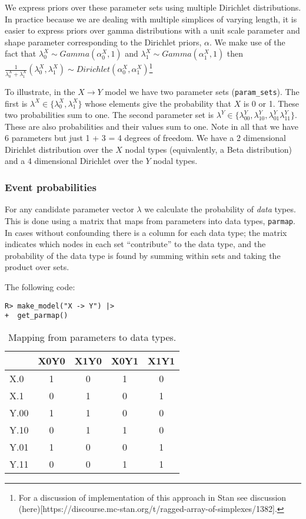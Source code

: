 \documentclass[
  11pt,
  article]{jss}
\begin{document}
We express priors over these parameter sets using multiple Dirichlet
distributions. In practice because we are dealing with multiple
simplices of varying length, it is easier to express priors over gamma
distributions with a unit scale parameter and shape parameter
corresponding to the Dirichlet priors, \(\alpha\). We make use of the
fact that \(\lambda^X_0 \sim Gamma(\alpha^X_0,1)\) and
\(\lambda^X_1 \sim Gamma(\alpha^X_1,1)\) then
\(\frac{1}{\lambda^X_0 +\lambda^X_1}(\lambda^X_0, \lambda^X_1) \sim Dirichlet(\alpha^X_0, \alpha^X_1)\)\footnote{For
  a discussion of implementation of this approach in Stan see discussion
  (here){[}https://discourse.mc-stan.org/t/ragged-array-of-simplexes/1382{]}.}

To illustrate, in the \(X \rightarrow Y\) model we have two parameter
sets (\texttt{param\_sets}). The first is
\(\lambda^X \in \{\lambda^X_0, \lambda^X_1\}\) whose elements give the
probability that \(X\) is 0 or 1. These two probabilities sum to one.
The second parameter set is
\(\lambda^Y \in \{\lambda^Y_{00}, \lambda^Y_{10}, \lambda^Y_{01} \lambda^Y_{11}\}\).
These are also probabilities and their values sum to one. Note in all
that we have 6 parameters but just 1 + 3 = 4 degrees of freedom. We have
a 2 dimensional Dirichlet distribution over the \(X\) nodal types
(equivalently, a Beta distribution) and a 4 dimensional Dirichlet over
the \(Y\) nodal types.

\hypertarget{event-probabilities}{%
\subsubsection{Event probabilities}\label{event-probabilities}}

For any candidate parameter vector \(\lambda\) we calculate the
probability of \emph{data} types. This is done using a matrix that maps
from parameters into data types, \texttt{parmap}. In cases without
confounding there is a column for each data type; the matrix indicates
which nodes in each set ``contribute'' to the data type, and the
probability of the data type is found by summing within sets and taking
the product over sets.

The following code:

\begin{verbatim}
R> make_model("X -> Y") |> 
+  get_parmap() 
\end{verbatim}

\hypertarget{tbl-parmap}{}
\begin{table}
\caption{\label{tbl-parmap}Mapping from parameters to data types. }\tabularnewline

\centering
\begin{tabular}{lcccc}
\toprule
  & X0Y0 & X1Y0 & X0Y1 & X1Y1\\
\midrule
X.0 & 1 & 0 & 1 & 0\\
X.1 & 0 & 1 & 0 & 1\\
Y.00 & 1 & 1 & 0 & 0\\
Y.10 & 0 & 1 & 1 & 0\\
Y.01 & 1 & 0 & 0 & 1\\
Y.11 & 0 & 0 & 1 & 1\\
\bottomrule
\end{tabular}
\end{table}
\end{document}

